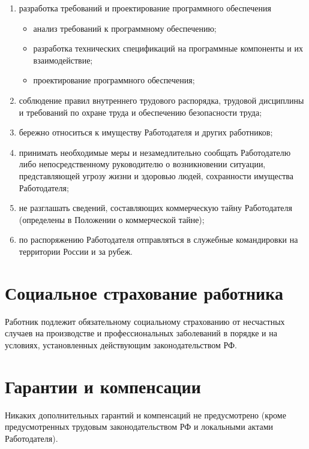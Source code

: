 \documentclass[a4paper]{article}
\begin{document}
\begin{enumerate}
			\item разработка требований и проектирование программного обеспечения
			\begin{itemize}
				\item анализ требований к программному обеспечению;
				
				\item разработка технических спецификаций на программные компоненты и их взаимодействие;
				
				\item проектирование программного обеспечения;
			\end{itemize}
			
			\item соблюдение правил внутреннего трудового распорядка, трудовой дисциплины и требований по охране труда и обеспечению безопасности труда;
			
			\item бережно относиться к имуществу Работодателя и других работников;
			
			\item принимать необходимые меры и незамедлительно сообщать Работодателю либо непосредственному руководителю о возникновении ситуации, представляющей угрозу жизни и здоровью людей, сохранности имущества Работодателя;
			
			\item не разглашать сведений, составляющих коммерческую тайну Работодателя (определены в Положении о коммерческой тайне);
			
			\item по распоряжению Работодателя отправляться в служебные командировки на территории России и за рубеж.
		\end{enumerate}
	
	\section{Социальное страхование работника}
		Работник подлежит обязательному социальному страхованию от несчастных случаев на производстве и профессиональных заболеваний в порядке и на условиях, установленных действующим законодательством РФ.
	
	\section{Гарантии и компенсации}
		Никаких дополнительных гарантий и компенсаций не предусмотрено (кроме предусмотренных трудовым законодательством РФ и локальными актами Работодателя).
	
\end{document}
